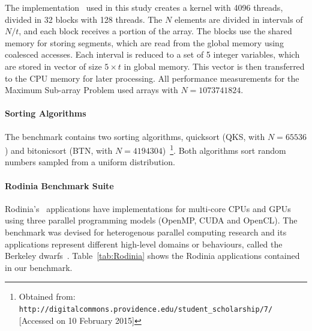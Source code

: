 The implementation~\cite{ferreira2014parallel} used in this study creates a
kernel with 4096 threads, divided in 32 blocks with 128 threads.  The $N$
elements are divided in intervals of $N/t$, and each block receives a portion
of the array.  The blocks use the shared memory for storing segments, which are
read from the global memory using coalesced accesses. Each interval is reduced
to a set of 5 integer variables, which are stored in vector of size $5 \times
t$ in global memory. This vector is then transferred to the CPU memory for
later processing.  All performance measurements for the Maximum Sub-array
Problem used arrays with $N = 1073741824$.

\paragraph{Sorting Algorithms} The benchmark contains two sorting algorithms,
quicksort (QKS, with $N = 65536$) and bitonicsort (BTN, with $N =
4194304$)~\footnote{Obtained from: \texttt{\scriptsize
http://digitalcommons.providence.edu/student\_scholarship/7/} [Accessed on 10
February 2015]}.  Both algorithms sort random numbers sampled from a uniform
distribution.

\paragraph{Rodinia Benchmark Suite} Rodinia's~\cite{che2009rodinia}
applications have implementations for multi-core CPUs and GPUs using three
parallel programming models (OpenMP, CUDA and OpenCL). The benchmark was
devised for heterogenous parallel computing research and its applications
represent different high-level domains or behaviours, called the Berkeley
dwarfs~\cite{asanovic2006landscape, asanovic2009view}.
Table~\ref{tab:Rodinia} shows the Rodinia applications contained in our
benchmark.

